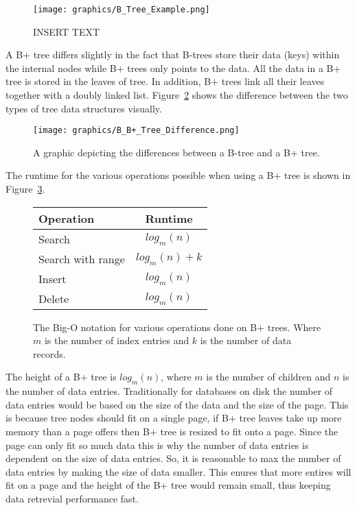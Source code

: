 \documentclass[letterpaper, 12pt]{article}
\begin{document}
\begin{figure}
  \centering
  \texttt{[image: graphics/B\_Tree\_Example.png]}
  \cite{b+tree}
  \caption{INSERT TEXT}
  \label{fig:b_tree_ex}
\end{figure}

A B+ tree differs slightly in the fact that B-trees store their data (keys) within the internal nodes while 
B+ trees only points to the data. All the data in a B+ tree is stored in the leaves of tree. In addition,
B+ trees link all their leaves together with a doubly linked list. Figure~\ref{fig:b_b+_tree_diff} shows
the difference between the two types of tree data structures visually.
\par\vspace{\baselineskip}

\begin{figure}
  \centering
  \texttt{[image: graphics/B\_B+\_Tree\_Difference.png]}
  \cite{b+tree}
  \caption{A graphic depicting the differences between a B-tree and a B+ tree.}
  \label{fig:b_b+_tree_diff}
\end{figure}

The runtime for the various operations possible when using a B+ tree is shown
in Figure~\ref{fig:b+_tree_runtimes}.

\begin{figure}
  \centering
  \begin{tabular}{l | c}
    Operation & Runtime \\ \hline \hline
    Search & $log_m(n)$ \\ \hline
    Search with range & $log_m(n) + k$ \\
    Insert & $log_m(n)$ \\ \hline
    Delete & $log_m(n)$ \\ \hline
  \end{tabular}
  \label{fig:b+_tree_runtimes}
  \caption{The Big-O notation for various operations done on B+ trees. Where $m$ is the 
	   number of index entries and $k$ is the number of data records.}
\end{figure}

The height of a B+ tree is $log_m(n)$, where $m$ is the number of children and $n$ is the number of data entries.
Traditionally for databases on disk the number of data entries would be based on the size of the data and
the size of the page. This is because tree nodes should fit on a single page, if B+ tree leaves take up more
memory than a page offers then B+ tree is resized to fit onto a page. Since the page can only fit so much
data this is why the number of data entries is dependent on the size of data entries. So, it is reasonable
to max the number of data entries by making the size of data smaller. This enures that more entires will
fit on a page and the height of the B+ tree would remain small, thus keeping data retrevial performance fast.
\par\vspace{\baselineskip}
\end{document}
